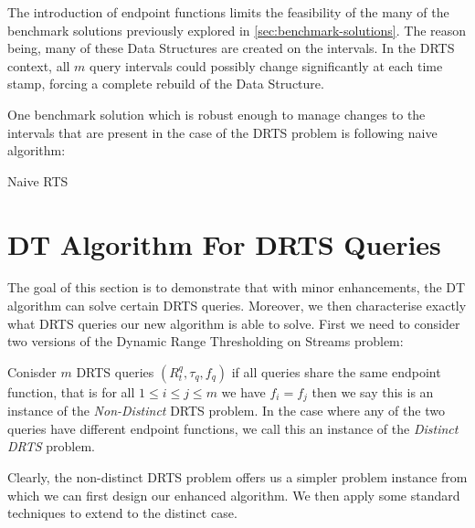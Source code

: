 The introduction of endpoint functions limits the feasibility of the many of the benchmark solutions previously explored in \cref{sec:benchmark-solutions}. The reason being, many of these Data Structures are created on the intervals. In the DRTS context, all $m$ query intervals could possibly change significantly at each time stamp, forcing a complete rebuild of the Data Structure.

One benchmark solution which is robust enough to manage changes to the intervals that are present in the case of the DRTS problem is following naive algorithm:

\begin{algorithm}
\caption{Naive RTS}\label{alg:naive-drts}
\begin{algorithmic}[1]
\State {}
\State {}
\State {}
\State {}
\EndFor
\EndFor
\EndProcedure
\end{algorithmic}
\end{algorithm}

\section{DT Algorithm For DRTS Queries}
\label{sec:drts-dt-algorithm}

The goal of this section is to demonstrate that with minor enhancements, the DT algorithm can solve certain DRTS queries. Moreover, we then characterise exactly what DRTS queries our new algorithm is able to solve. First we need to consider two versions of the Dynamic Range Thresholding on Streams problem: 

\begin{definition}
    Conisder $m$ DRTS queries $(R_{t}^q, \tau_q, f_q)$ if all queries share the same endpoint function, that is for all $1\leq i\leq  j\leq m$ we have $f_i = f_j$ then we say this is an instance of the \textit{Non-Distinct} DRTS problem. In the case where any of the two queries have different endpoint functions, we call this an instance of the \textit{Distinct DRTS} problem.
\end{definition}

Clearly, the non-distinct DRTS problem offers us a simpler problem instance from which we can first design our enhanced algorithm. We then apply some standard techniques to extend to the distinct case. 

